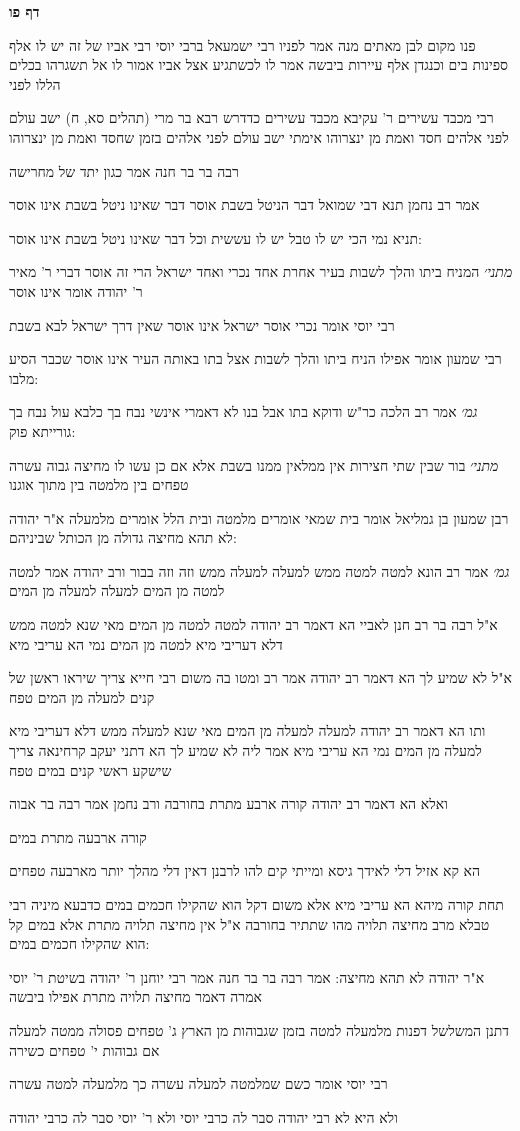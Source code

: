 \documentclass[12pt, openany]{book}
\newcommand{\sethebfont}{
\fontsize{10.5pt}{21.0pt} \selectfont
}
\newcommand{\textblock}[1]{
{\sethebfont #1\\}	
}
\newcommand{\sectname}{}
\newcommand{\newsection}[1]{
	\addcontentsline{toc}{section}{#1}
	\renewcommand{\sectname}{#1}	
	\vspace{-\baselineskip}
	\begin{center}
		\textbf{%
\fontsize{16pt}{16pt}\selectfont
			#1}
	\end{center}
	\vspace{-\baselineskip}
	\nopagebreak
}
\begin{document}
\newsection{דף פו}
\textblock{פנו מקום לבן מאתים מנה אמר לפניו רבי ישמעאל ברבי יוסי רבי אביו של זה יש לו אלף ספינות בים וכנגדן אלף עיירות ביבשה אמר לו לכשתגיע אצל אביו אמור לו אל תשגרהו בכלים הללו לפני}
\textblock{רבי מכבד עשירים ר' עקיבא מכבד עשירים כדדרש רבא בר מרי (תהלים סא, ח) ישב עולם לפני אלהים חסד ואמת מן ינצרוהו אימתי ישב עולם לפני אלהים בזמן שחסד ואמת מן ינצרוהו}
\textblock{רבה בר בר חנה אמר כגון יתד של מחרישה}
\textblock{אמר רב נחמן תנא דבי שמואל דבר הניטל בשבת אוסר דבר שאינו ניטל בשבת אינו אוסר}
\textblock{תניא נמי הכי יש לו טבל יש לו עששית וכל דבר שאינו ניטל בשבת אינו אוסר:}
\textblock{{\large\emph{מתני׳}} המניח ביתו והלך לשבות בעיר אחרת אחד נכרי ואחד ישראל הרי זה אוסר דברי ר' מאיר ר' יהודה אומר אינו אוסר}
\textblock{רבי יוסי אומר נכרי אוסר ישראל אינו אוסר שאין דרך ישראל לבא בשבת}
\textblock{רבי שמעון אומר אפילו הניח ביתו והלך לשבות אצל בתו באותה העיר אינו אוסר שכבר הסיע מלבו:}
\textblock{{\large\emph{גמ׳}} אמר רב הלכה כר"ש ודוקא בתו אבל בנו לא דאמרי אינשי נבח בך כלבא עול נבח בך גורייתא פוק:}
\textblock{{\large\emph{מתני׳}} בור שבין שתי חצירות אין ממלאין ממנו בשבת אלא אם כן עשו לו מחיצה גבוה עשרה טפחים בין מלמטה בין מתוך אוגנו}
\textblock{רבן שמעון בן גמליאל אומר בית שמאי אומרים מלמטה ובית הלל אומרים מלמעלה א"ר יהודה לא תהא מחיצה גדולה מן הכותל שביניהם:}
\textblock{{\large\emph{גמ׳}} אמר רב הונא למטה למטה ממש למעלה למעלה ממש וזה וזה בבור ורב יהודה אמר למטה למטה מן המים למעלה למעלה מן המים}
\textblock{א"ל רבה בר רב חנן לאביי הא דאמר רב יהודה למטה למטה מן המים מאי שנא למטה ממש דלא דעריבי מיא למטה מן המים נמי הא עריבי מיא}
\textblock{א"ל לא שמיע לך הא דאמר רב יהודה אמר רב ומטו בה משום רבי חייא צריך שיראו ראשן של קנים למעלה מן המים טפח}
\textblock{ותו הא דאמר רב יהודה למעלה למעלה מן המים מאי שנא למעלה ממש דלא דעריבי מיא למעלה מן המים נמי הא עריבי מיא אמר ליה לא שמיע לך הא דתני יעקב קרחינאה צריך שישקע ראשי קנים במים טפח}
\textblock{ואלא הא דאמר רב יהודה קורה ארבע מתרת בחורבה ורב נחמן אמר רבה בר אבוה}
\textblock{קורה ארבעה מתרת במים}
\textblock{הא קא אזיל דלי לאידך גיסא ומייתי קים להו לרבנן דאין דלי מהלך יותר מארבעה טפחים }
\textblock{תחת קורה מיהא הא עריבי מיא אלא משום דקל הוא שהקילו חכמים במים כדבעא מיניה רבי טבלא מרב מחיצה תלויה מהו שתתיר בחורבה א"ל אין מחיצה תלויה מתרת אלא במים קל הוא שהקילו חכמים במים:}
\textblock{א"ר יהודה לא תהא מחיצה: אמר רבה בר בר חנה אמר רבי יוחנן ר' יהודה בשיטת ר' יוסי אמרה דאמר מחיצה תלויה מתרת אפילו ביבשה}
\textblock{דתנן המשלשל דפנות מלמעלה למטה בזמן שגבוהות מן הארץ ג' טפחים פסולה ממטה למעלה אם גבוהות י' טפחים כשירה}
\textblock{רבי יוסי אומר כשם שמלמטה למעלה עשרה כך מלמעלה למטה עשרה}
\textblock{ולא היא לא רבי יהודה סבר לה כרבי יוסי ולא ר' יוסי סבר לה כרבי יהודה}
\end{document}
